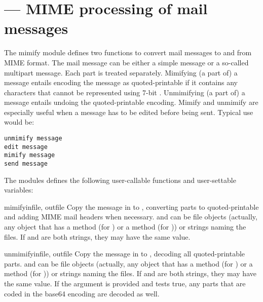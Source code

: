 \section{ ---
         MIME processing of mail messages}



The mimify module defines two functions to convert mail messages to
and from MIME format.  The mail message can be either a simple message
or a so-called multipart message.  Each part is treated separately.
Mimifying (a part of) a message entails encoding the message as
quoted-printable if it contains any characters that cannot be
represented using 7-bit \ASCII.  Unmimifying (a part of) a message
entails undoing the quoted-printable encoding.  Mimify and unmimify
are especially useful when a message has to be edited before being
sent.  Typical use would be:

\begin{verbatim}
unmimify message
edit message
mimify message
send message
\end{verbatim}

The modules defines the following user-callable functions and
user-settable variables:

\begin{funcdesc}{mimify}{infile, outfile}
Copy the message in  to , converting parts to
quoted-printable and adding MIME mail headers when necessary.
 and  can be file objects (actually, any
object that has a  method (for ) or a
 method (for )) or strings naming the files.
If  and  are both strings, they may have the
same value.
\end{funcdesc}

\begin{funcdesc}{unmimify}{infile, outfile}
Copy the message in  to , decoding all
quoted-printable parts.   and  can be file
objects (actually, any object that has a  method (for
) or a  method (for )) or strings
naming the files.  If  and  are both strings,
they may have the same value.
If the  argument is provided and tests true, any
parts that are coded in the base64 encoding are decoded as well.
\end{funcdesc}

